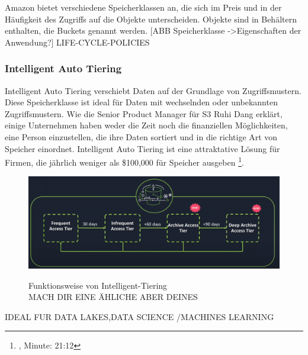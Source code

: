 Amazon bietet verschiedene Speicherklassen an, die sich im Preis und in der Häufigkeit des Zugriffs auf die Objekte unterscheiden. Objekte sind in Behältern enthalten, die Buckets genannt werden.
[ABB Speicherklasse ->Eigenschaften der Anwendung?]
LIFE-CYCLE-POLICIES

\subsubsection{Intelligent Auto Tiering}
Intelligent Auto Tiering verschiebt Daten auf der Grundlage von Zugriffsmustern. Diese Speicherklasse ist ideal für Daten mit wechselnden oder unbekannten Zugriffsmustern. 
Wie die Senior Product Manager für S3 Ruhi Dang erklärt, einige Unternehmen haben weder die Zeit noch die finanziellen Möglichkeiten, eine Person einzustellen, die ihre Daten sortiert und in die richtige Art von Speicher einordnet. Intelligent Auto Tiering ist eine attraktative Lösung für Firmen, die jährlich weniger als \$100,000 für Speicher ausgeben \footnote{\cite{AMZ16}, Minute: 21:12}.

\begin{figure}[h!]
  \centering
  \includegraphics[scale=0.5]{sources/S3_IntLifeCycle}
  \caption[Funktionsweise von Intelligent-Tiering]{}\label{fig:S3_IntLifeCycle} Funktionsweise von Intelligent-Tiering\\
  MACH DIR EINE ÄHLICHE ABER DEINES
\end{figure}


IDEAL FUR DATA LAKES,DATA SCIENCE /MACHINES LEARNING

















